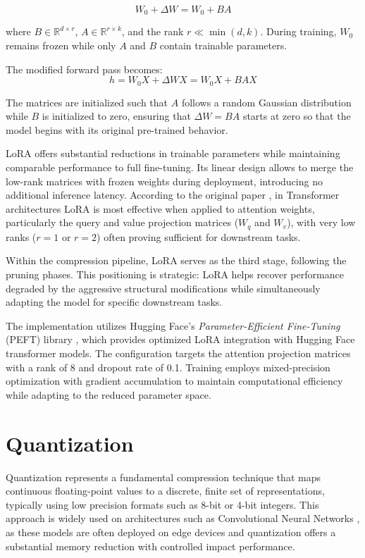 \begin{equation}
W_0 + \Delta W = W_0 + BA
\end{equation}

where $B \in \mathbb{R}^{d \times r}$, $A \in \mathbb{R}^{r \times k}$, and the rank $r \ll \min(d,k)$. During training, $W_0$ remains frozen while only $A$ and $B$ contain trainable parameters.

The modified forward pass becomes:
\begin{equation}
h = W_0X + \Delta WX = W_0X + BAX
\end{equation}

The matrices are initialized such that $A$ follows a random Gaussian distribution while $B$ is initialized to zero, ensuring that $\Delta W = BA$ starts at zero so that the model begins with its original pre-trained behavior.

LoRA offers substantial reductions in trainable parameters while maintaining comparable performance to full fine-tuning. Its linear design allows to merge the low-rank matrices with frozen weights during deployment, introducing no additional inference latency. According to the original paper \cite{lora}, in Transformer architectures LoRA is most effective when applied to attention weights, particularly the query and value projection matrices ($W_q$ and $W_v$), with very low ranks ($r=1$ or $r=2$) often proving sufficient for downstream tasks.

Within the compression pipeline, LoRA serves as the third stage, following the pruning phases. This positioning is strategic: LoRA helps recover performance degraded by the aggressive structural modifications while simultaneously adapting the model for specific downstream tasks.

The implementation utilizes Hugging Face's \textit{Parameter-Efficient Fine-Tuning} (PEFT) library \cite{peft}, which provides optimized LoRA integration with Hugging Face transformer models. The configuration targets the attention projection matrices with a rank of 8 and dropout rate of 0.1. Training employs mixed-precision optimization with gradient accumulation to maintain computational efficiency while adapting to the reduced parameter space.

\section{Quantization} \label{quantization}

Quantization represents a fundamental compression technique that maps continuous floating-point values to a discrete, finite set of representations, typically using low precision formats such as 8-bit or 4-bit integers. This approach is widely used on architectures such as Convolutional Neural Networks \cite{quant_cnn}, as these models are often deployed on edge devices and quantization offers a substantial memory reduction with controlled impact performance.

